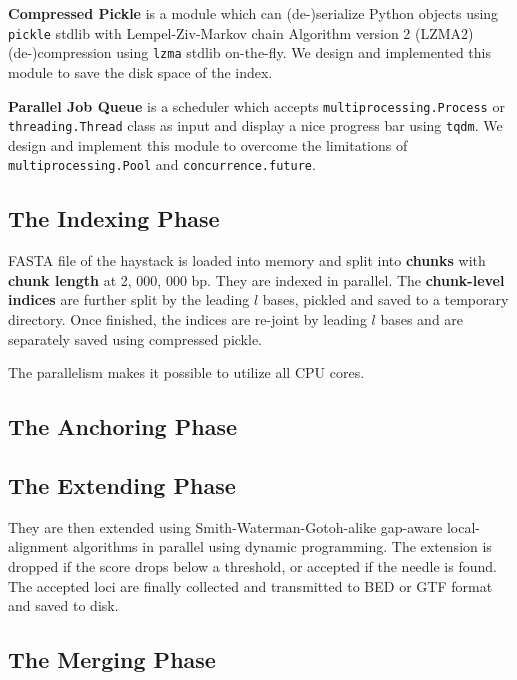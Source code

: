 \documentclass[10pt,final,journal,twocolumn,a4paper]{IEEEtran}
\begin{document}
\textbf{Compressed Pickle} is a module which can (de-)serialize Python objects using \verb|pickle| stdlib with Lempel-Ziv-Markov chain Algorithm version 2 (LZMA2) (de-)compression using \verb|lzma| stdlib on-the-fly. We design and implemented this module to save the disk space of the index.

\textbf{Parallel Job Queue} is a scheduler which accepts \verb|multiprocessing.Process| or \verb|threading.Thread| class as input and display a nice progress bar using \verb|tqdm|. We design and implement this module to overcome the limitations of \verb|multiprocessing.Pool| and \verb|concurrence.future|.

\subsection{The Indexing Phase}

FASTA file of the haystack is loaded into memory and split into \textbf{chunks} with \textbf{chunk length} at 2, 000, 000 bp. They are indexed in parallel. The \textbf{chunk-level indices} are further split by the leading $l$ bases, pickled and saved to a temporary directory. Once finished, the indices are re-joint by leading $l$ bases and are separately saved using compressed pickle.

The parallelism makes it possible to utilize all CPU cores.

\subsection{The Anchoring Phase}



\subsection{The Extending Phase}

They are then extended using Smith-Waterman-Gotoh-alike gap-aware local-alignment algorithms in parallel using dynamic programming. The extension is dropped if the score drops below a threshold, or accepted if the needle is found. The accepted loci are finally collected and transmitted to BED or GTF format and saved to disk.

\subsection{The \textbf{Merging} Phase}
\end{document}
